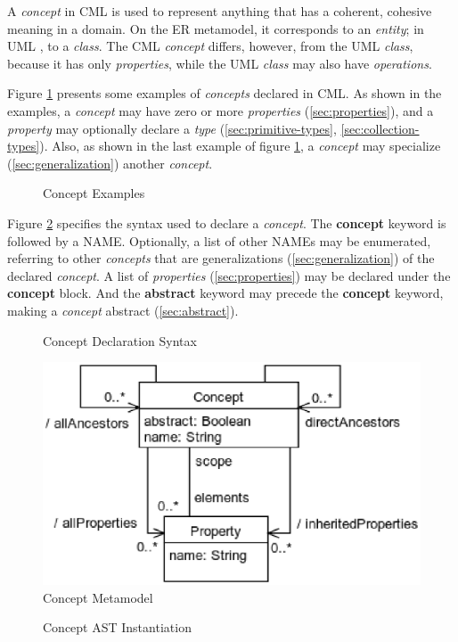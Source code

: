 A \emph{concept} in CML is used to represent anything
that has a coherent, cohesive meaning in a domain.
On the ER \cite{er} metamodel,
it corresponds to an \emph{entity};
in UML \cite{uml},
to a \emph{class}.
The CML \emph{concept} differs, however, from the UML \emph{class},
because it has only \emph{properties},
while the UML \emph{class} may also have \emph{operations}.

Figure \ref{fig:ex:concepts} presents some examples of \emph{concepts} declared in CML.
As shown in the examples,
a \emph{concept} may have zero or more \emph{properties}
(\ref{sec:properties}),
and a \emph{property} may optionally declare a \emph{type}
(\ref{sec:primitive-types}, \ref{sec:collection-types}).
Also, as shown in the last example of figure \ref{fig:ex:concepts},
a \emph{concept} may specialize
(\ref{sec:generalization})
another \emph{concept}.

\begin{figure}
\verbatimfont{\small}
\begin{framed}

\end{framed}
\caption{Concept Examples}
\label{fig:ex:concepts}
\end{figure}

Figure \ref{fig:stx:concept} specifies the syntax used
to declare a \emph{concept}.
The \textbf{concept} keyword is followed by a NAME.
Optionally, a list of other NAMEs may be enumerated,
referring to other \emph{concepts}
that are generalizations (\ref{sec:generalization}) of the declared \emph{concept}.
A list of \emph{properties} (\ref{sec:properties}) may be declared under the \textbf{concept} block.
And the \textbf{abstract} keyword may precede the \textbf{concept} keyword, making a \emph{concept} abstract (\ref{sec:abstract}).

\begin{figure}
\verbatimfont{\small}
\begin{framed}

\end{framed}
\caption{Concept Declaration Syntax}
\label{fig:stx:concept}
\end{figure}

\begin{figure}
\includegraphics[width=\textwidth]{metamodel/concept}
\caption{Concept Metamodel}
\label{fig:meta:concept}
\end{figure}

\begin{figure}
\verbatimfont{\small}
\begin{framed}

\end{framed}
\caption{Concept AST Instantiation}
\label{fig:ast:concept}
\end{figure}

